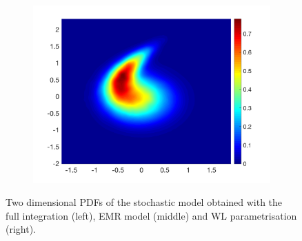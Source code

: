 \documentclass[12pt]{article}
\begin{document}
\begin{figure}[H]
\begin{subfigure}[b]{0.32\textwidth}
		\includegraphics[width=\textwidth]{plots/climate_model/h1/pdf2d_wl_e05_h1.png}
	\end{subfigure}
	\caption{\label{histograms 2d epsilon 1}Two dimensional PDFs of the stochastic model obtained with the full integration (left), EMR model (middle) and WL parametrisation (right).}
\end{figure}
\end{document}
